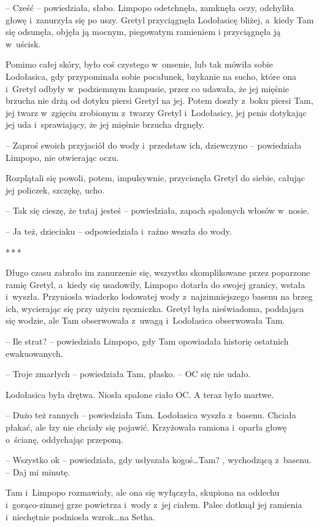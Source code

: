 \documentclass[oneside,polish,11pt,sfheadings]{mwbk}
\newcommand{\threeast}{\bigskip\par\centerline{*\,*\,*}\medskip\par}
\begin{document}
-- Cześć -- powiedziała, słabo. Limpopo odetchnęła, zamknęła oczy,
odchyliła głowę i~zanurzyła się po uszy. Gretyl przyciągnęła Lodołasicę
bliżej, a~kiedy Tam się odsunęła, objęła ją mocnym, piegowatym ramieniem
i przyciągnęła ją w~uścisk.

Pomimo całej skóry, było coś czystego w~onsenie, lub tak mówiła sobie
Lodołasica, gdy przypominała sobie pocałunek, bzykanie na sucho, które
ona i~Gretyl odbyły w~podziemnym kampusie, przez co udawała, że jej
mięśnie brzucha nie drżą od dotyku piersi Gretyl na jej. Potem doszły z~boku piersi Tam, jej twarz w~zgięciu zrobionym z~twarzy Gretyl i~Lodołasicy, jej penis dotykając jej uda i~sprawiający, że jej mięśnie
brzucha drgnęły.

-- Zaproś swoich przyjaciół do wody i~przedstaw ich, dziewczyno -- powiedziała Limpopo, nie otwierając oczu.

Rozplątali się powoli, potem, impulsywnie, przycisnęła Gretyl do siebie,
całując jej policzek, szczękę, ucho. 

-- Tak się cieszę, że tutaj jesteś -- powiedziała, zapach spalonych włosów w~nosie.

-- Ja też, dzieciaku -- odpowiedziała i~raźno weszła do wody.

\threeast

Długo czasu zabrało im zanurzenie się, wszystko skomplikowane przez
poparzone ramię Gretyl, a~kiedy się usadowiły, Limpopo dotarła do swojej
granicy, wstała i~wyszła. Przyniosła wiaderko lodowatej wody z~najzimniejszego basenu na brzeg ich, wycierając się przy użyciu
ręczniczka. Gretyl była nieświadoma, poddająca się wodzie, ale Tam
obserwowała z~uwagą i~Lodołasica obserwowała Tam.

-- Ile strat? -- powiedziała Limpopo, gdy Tam opowiadała historię
ostatnich ewakuowanych.

-- Troje zmarłych -- powiedziała Tam, płasko. -- OC się nie udało.

Lodołasica była drętwa. Niosła spalone ciało OC. A teraz było martwe.

-- Dużo też rannych -- powiedziała Tam. Lodołasica wyszła z~basenu.
Chciała płakać, ale łzy nie chciały się pojawić. Krzyżowała ramiona i~oparła głowę o~ścianę, oddychając przeponą. 

-- Wszystko ok -- powiedziała, gdy usłyszała kogoś\ldots  Tam? , wychodzącą z~basenu. -- Daj mi minutę.

Tam i~Limpopo rozmawiały, ale ona się wyłączyła, skupiona na oddechu i~gorąco-zimnej grze powietrza i~wody z~jej ciałem. Palec dotknął jej
ramienia i~niechętnie podniosła wzrok\ldots  na Setha.
\end{document}
